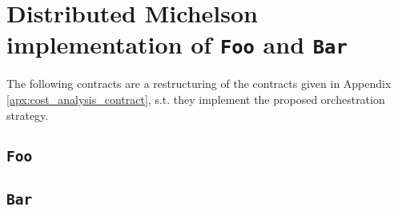 \chapter{Distributed Michelson implementation of \texttt{Foo} and \texttt{Bar}}\label{apx:foobar_distributed}
The following contracts are a restructuring of the contracts given in Appendix \ref{apx:cost_analysis_contract}, s.t. they implement the proposed orchestration strategy.

\section{\texttt{Foo}}




\section{\texttt{Bar}}


